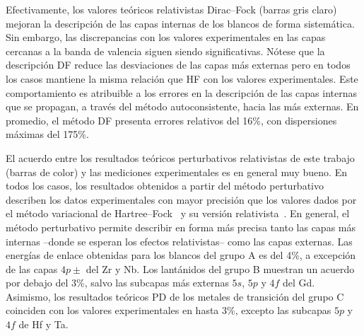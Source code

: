 
Efectivamente, los valores teóricos relativistas Dirac--Fock (barras 
gris claro) mejoran la descripción de las capas internas de los blancos 
de forma sistemática. Sin embargo, las discrepancias con los valores 
experimentales en las capas cercanas a la banda de valencia siguen 
siendo significativas. Nótese que la descripción DF reduce las 
desviaciones de las capas más externas pero en todos los casos mantiene 
la misma relación que HF con los valores experimentales. Este 
comportamiento es atribuible a los errores en la descripción de las 
capas internas que se propagan, a través del método autoconsistente, 
hacia las más externas. En promedio, el método DF presenta errores 
relativos del 16\%, con dispersiones máximas del 175\%. 

El acuerdo entre los resultados teóricos perturbativos relativistas de 
este trabajo (barras de color) y las mediciones experimentales es en 
general muy bueno. En todos los casos, los resultados obtenidos a partir 
del método perturbativo describen los datos experimentales con mayor 
precisión que los valores dados por el método variacional de 
Hartree--Fock~\cite{FroeseFischer:97} y su versión 
relativista~\cite{Desclaux:73}. En general, el método perturbativo 
permite describir en forma más precisa tanto las capas más internas 
--donde se esperan los efectos relativistas-- como las capas externas.
Las energías de enlace obtenidas para los blancos del grupo A es del 
4\%, a excepción de las capas $4p\pm$ del Zr y Nb. Los lantánidos del 
grupo B muestran un acuerdo por debajo del 3\%, salvo las subcapas más 
externas $5s$, $5p$ y $4f$ del Gd. Asimismo, los resultados teóricos PD 
de los metales de transición del grupo C coinciden con los valores 
experimentales en hasta 3\%, excepto las subcapas $5p$ y $4f$ de Hf y 
Ta. 


